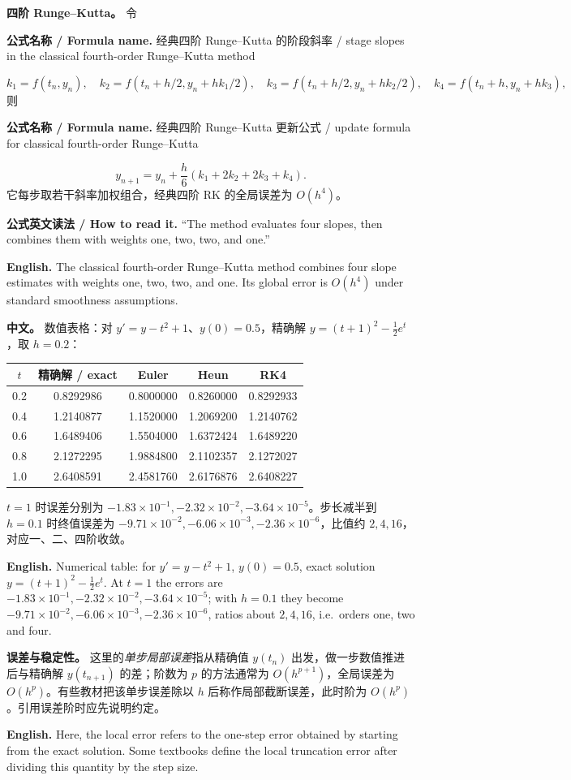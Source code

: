 \documentclass[UTF8,11pt,a4paper]{ctexart}
\newcommand{\EN}[1]{\par\noindent\textbf{English.} #1\par}
\newcommand{\READ}[1]{\par\noindent\textbf{公式英文读法 / How to read it.} #1\par}
\newcommand{\FORMULA}[2]{\par\noindent\textbf{公式名称 / Formula name.} #1 / #2\par}
\newcommand{\APS}[2]{\par\noindent\textbf{中文。} #1\par\noindent\textbf{English.} #2\par\smallskip}
\begin{document}
\noindent\textbf{四阶 Runge--Kutta。} 令
\FORMULA{经典四阶 Runge--Kutta 的阶段斜率}{stage slopes in the classical fourth-order Runge--Kutta method}
\[
k_1=f(t_n,y_n),\quad k_2=f(t_n+h/2,y_n+hk_1/2),\quad
k_3=f(t_n+h/2,y_n+hk_2/2),\quad k_4=f(t_n+h,y_n+hk_3),
\]
则
\FORMULA{经典四阶 Runge--Kutta 更新公式}{update formula for classical fourth-order Runge--Kutta}
\[
y_{n+1}=y_n+\frac h6(k_1+2k_2+2k_3+k_4).
\]
它每步取若干斜率加权组合，经典四阶 RK 的全局误差为 $O(h^4)$。
\READ{“The method evaluates four slopes, then combines them with weights one, two, two, and one.”}
\EN{The classical fourth-order Runge--Kutta method combines four slope estimates with weights one, two, two, and one. Its global error is $O(h^4)$ under standard smoothness assumptions.}

\APS{数值表格：对 $y'=y-t^2+1$、$y(0)=0.5$，精确解 $y=(t+1)^2-\tfrac12e^t$，取 $h=0.2$：
\begin{center}\footnotesize
\begin{tabular}{c c c c c}
\hline
$t$ & 精确解 / exact & Euler & Heun & RK4\\
\hline
0.2 & 0.8292986 & 0.8000000 & 0.8260000 & 0.8292933\\
0.4 & 1.2140877 & 1.1520000 & 1.2069200 & 1.2140762\\
0.6 & 1.6489406 & 1.5504000 & 1.6372424 & 1.6489220\\
0.8 & 2.1272295 & 1.9884800 & 2.1102357 & 2.1272027\\
1.0 & 2.6408591 & 2.4581760 & 2.6176876 & 2.6408227\\
\hline
\end{tabular}
\end{center}
$t=1$ 时误差分别为 $-1.83\times10^{-1},-2.32\times10^{-2},-3.64\times10^{-5}$。步长减半到 $h=0.1$ 时终值误差为 $-9.71\times10^{-2},-6.06\times10^{-3},-2.36\times10^{-6}$，比值约 $2,4,16$，对应一、二、四阶收敛。}{Numerical table: for $y'=y-t^2+1$, $y(0)=0.5$, exact solution $y=(t+1)^2-\tfrac12e^t$. At $t=1$ the errors are $-1.83\times10^{-1},-2.32\times10^{-2},-3.64\times10^{-5}$; with $h=0.1$ they become $-9.71\times10^{-2},-6.06\times10^{-3},-2.36\times10^{-6}$, ratios about $2,4,16$, i.e.\ orders one, two and four.}

\noindent\textbf{误差与稳定性。} 这里的\emph{单步局部误差}指从精确值 $y(t_n)$ 出发，做一步数值推进后与精确解 $y(t_{n+1})$ 的差；阶数为 $p$ 的方法通常为 $O(h^{p+1})$，全局误差为 $O(h^p)$。有些教材把该单步误差除以 $h$ 后称作局部截断误差，此时阶为 $O(h^p)$。引用误差阶时应先说明约定。
\EN{Here, the local error refers to the one-step error obtained by starting from the exact solution. Some textbooks define the local truncation error after dividing this quantity by the step size.}
\end{document}
